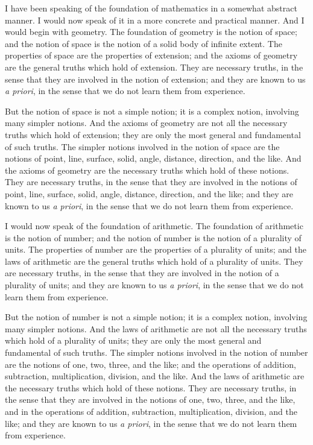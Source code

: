 \documentclass[11pt,a4paper]{article}
\begin{document}
I have been speaking of the foundation of mathematics in a somewhat
abstract manner. I would now speak of it in a more concrete and
practical manner. And I would begin with geometry. The foundation of
geometry is the notion of space; and the notion of space is the notion
of a solid body of infinite extent. The properties of space are the
properties of extension; and the axioms of geometry are the general
truths which hold of extension. They are necessary truths, in the sense
that they are involved in the notion of extension; and they are known to
us \textit{a priori}, in the sense that we do not learn them from
experience.

But the notion of space is not a simple notion; it is a complex notion,
involving many simpler notions. And the axioms of geometry are not all
the necessary truths which hold of extension; they are only the most
general and fundamental of such truths. The simpler notions involved in
the notion of space are the notions of point, line, surface, solid,
angle, distance, direction, and the like. And the axioms of geometry
are the necessary truths which hold of these notions. They are
necessary truths, in the sense that they are involved in the notions of
point, line, surface, solid, angle, distance, direction, and the like;
and they are known to us \textit{a priori}, in the sense that we do not
learn them from experience.

I would now speak of the foundation of arithmetic. The foundation of
arithmetic is the notion of number; and the notion of number is the
notion of a plurality of units. The properties of number are the
properties of a plurality of units; and the laws of arithmetic are the
general truths which hold of a plurality of units. They are necessary
truths, in the sense that they are involved in the notion of a plurality
of units; and they are known to us \textit{a priori}, in the sense that
we do not learn them from experience.

But the notion of number is not a simple notion; it is a complex notion,
involving many simpler notions. And the laws of arithmetic are not all
the necessary truths which hold of a plurality of units; they are only
the most general and fundamental of such truths. The simpler notions
involved in the notion of number are the notions of one, two, three,
and the like; and the operations of addition, subtraction,
multiplication, division, and the like. And the laws of arithmetic are
the necessary truths which hold of these notions. They are necessary
truths, in the sense that they are involved in the notions of one, two,
three, and the like, and in the operations of addition, subtraction,
multiplication, division, and the like; and they are known to us
\textit{a priori}, in the sense that we do not learn them from
experience.
\end{document}

